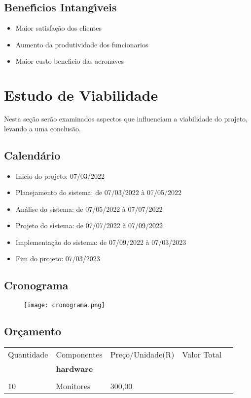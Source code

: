 \subsection{Benef\'{\i}cios Intang\'{\i}veis}
\begin{itemize}
       \item Maior satisfação dos clientes
       \item Aumento da produtividade dos funcionarios
       \item Maior custo beneficio das aeronaves
\end{itemize}


\section{Estudo de Viabilidade}
Nesta seção serão examinados aspectos que influenciam a viabilidade do projeto, levando a uma
conclusão.

\subsection{Calend\'{a}rio }
\begin{itemize}
       \item Inicio do projeto: 07/03/2022
       \item Planejamento do sistema: de 07/03/2022 à 07/05/2022
       \item Análise do sistema: de 07/05/2022 à 07/07/2022
       \item Projeto do sistema: de 07/07/2022 à 07/09/2022
       \item Implementação do sistema: de 07/09/2022 à 07/03/2023
       \item Fim do projeto: 07/03/2023
\end{itemize}


\subsection{Cronograma}
\begin{figure}[h]
 \texttt{[image: cronograma.png]}
\end{figure}



\subsection{Or\c{c}amento }

\begin{tabular}{lllll}
       Quantidade & Componentes       & Preço/Unidade(R) & Valor Total &  \\
                  & \textbf{hardware} &                    &             &  \\
                  &                   &                    &             &  \\
       10         & Monitores         & 300,00             &             & 
\end{tabular}



